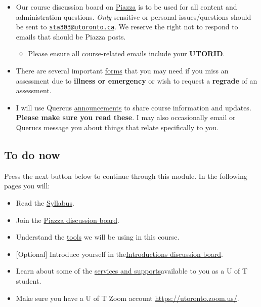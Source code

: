 \documentclass[
]{book}
\providecommand{\tightlist}{%
  \setlength{\itemsep}{0pt}\setlength{\parskip}{0pt}}
\begin{document}
\begin{itemize}
\item
  Our course discussion board on \href{https://piazza.com/class/kx47tj4fmy65dg}{Piazza} is to be used for all content and administration questions. \emph{Only} sensitive or personal issues/questions should be sent to \href{mailto:sta303@utoronto.ca}{\nolinkurl{sta303@utoronto.ca}}. We reserve the right not to respond to emails that should be Piazza posts.

  \begin{itemize}
  \tightlist
  \item
    Please ensure all course-related emails include your \textbf{UTORID}.~
  \end{itemize}
\item
  There are several important \protect\hyperlink{forms}{forms} that you may need if you miss an assessment due to \textbf{illness or emergency} or wish to request a \textbf{regrade} of an assessment.
\item
  I will use Quercus \href{https://q.utoronto.ca/courses/253305/announcements}{announcements} to share course information and updates. \textbf{Please make sure you read these}. I may also occasionally email or Querucs message you about things that relate specifically to you.
\end{itemize}

\hypertarget{to-do-now}{%
\subsection{To do now}\label{to-do-now}}

Press the next button below to continue through this module. In the following pages you will:

\begin{itemize}
\item
  Read the \href{https://q.utoronto.ca/courses/204826/assignments/syllabus}{Syllabus}.~
\item
  Join the \href{http://piazza.com/utoronto.ca/winter2021/sta303h11002hs}{Piazza discussion board}.
\item
  Understand the \href{https://q.utoronto.ca/courses/204826/pages/course-tools}{tools} we will be using in this course.
\item
  {[}Optional{]} Introduce yourself in the\href{https://q.utoronto.ca/courses/204826/discussion_topics/763676}{Introductions discussion board}.
\item
  Learn about some of the \href{https://q.utoronto.ca/courses/204826/pages/services-and-support}{services and supports}available to you as a U of T student.
\item
  Make sure you have a U of T Zoom account \url{https://utoronto.zoom.us/}.~
\end{itemize}
\end{document}
